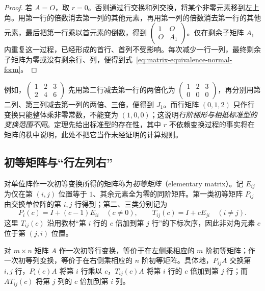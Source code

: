 \begin{proof}
若 $A=O$，取 $r=0$。否则通过行交换和列交换，将某个非零元素移到左上角。用第一行的倍数消去第一列的其他元素，再用第一列的倍数消去第一行的其他元素，最后把第一行乘以首元素的倒数，得到 $\begin{pmatrix}1&O\\O&A_1\end{pmatrix}$。仅在剩余子矩阵 $A_1$ 内重复这一过程，已经形成的首行、首列不受影响。每次减少一行一列，最终剩余子矩阵为零或没有剩余行、列，便得到式~\eqref{eq:matrix-equivalence-normal-form}。
\end{proof}

例如，$\begin{pmatrix}1&2&3\\2&4&6\end{pmatrix}$ 先用第二行减去第一行的两倍化为 $\begin{pmatrix}1&2&3\\0&0&0\end{pmatrix}$，再分别用第二列、第三列减去第一列的两倍、三倍，便得到 $J_1$。而行矩阵 $(0,1,2)$ 只作行变换只能整体乘非零常数，不能变为 $(1,0,0)$；这说明\emph{行阶梯形与相抵标准型的变换范围不同}。定理先给出标准型的存在性，其中 $r$ 不依赖变换过程的事实将在矩阵的秩中说明，此处不把它当作未经证明的计算规则。

\subsection{初等矩阵与“行左列右”}

\begin{definition}
\label{def:matrix-elementary-matrices}
对单位阵作一次初等变换所得的矩阵称为\emph{初等矩阵}（elementary matrix）。记 $E_{ij}$ 为仅在第 $(i,j)$ 位置等于 $1$、其余元素全为零的同阶矩阵。第一类初等矩阵 $P_{ij}$ 由交换单位阵的第 $i,j$ 行得到；第二、三类分别记为
\[
    P_i(c)=I+(c-1)E_{ii}\quad(c\ne0),\qquad
    T_{ij}(c)=I+cE_{ji}\quad(i\ne j).
\]
这里 $T_{ij}(c)$ 沿用教材“第 $i$ 行的 $c$ 倍加到第 $j$ 行”的下标次序，因此非对角元素 $c$ 位于第 $(j,i)$ 位置。
\end{definition}

\begin{theorem}[初等变换的矩阵表示]
\label{thm:matrix-elementary-left-right}
对 $m\times n$ 矩阵 $A$ 作一次初等行变换，等价于在左侧乘相应的 $m$ 阶初等矩阵；作一次初等列变换，等价于在右侧乘相应的 $n$ 阶初等矩阵。具体地，$P_{ij}A$ 交换第 $i,j$ 行，$P_i(c)A$ 将第 $i$ 行乘以 $c$，$T_{ij}(c)A$ 将第 $i$ 行的 $c$ 倍加到第 $j$ 行；而 $AT_{ij}(c)$ 将第 $j$ 列的 $c$ 倍加到第 $i$ 列。
\end{theorem}

